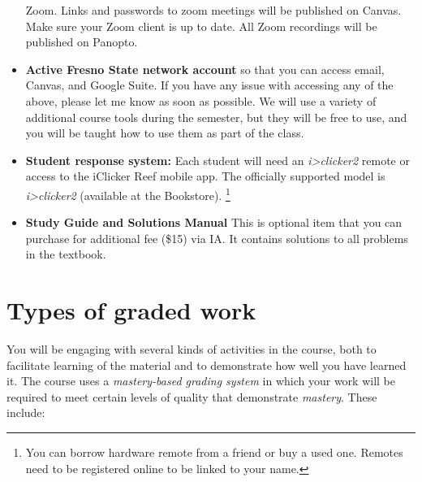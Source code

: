 \begin{itemize}
  Zoom. Links and passwords to zoom meetings will be published on
  Canvas. Make sure your Zoom client is up to date. All Zoom recordings
  will be published on Panopto.
\item
  \textbf{Active Fresno State network account} so that you can access
  email, Canvas, and Google Suite. If you have any issue with accessing
  any of the above, please let me know as soon as possible. We will use
  a variety of additional course tools during the semester, but they
  will be free to use, and you will be taught how to use them as part of
  the class.
\item
  \textbf{Student response system:} Each student will need an
  \emph{i\textgreater clicker2} remote or access to the iClicker Reef
  mobile app. The officially supported model is
  \emph{i\textgreater clicker2} (available at the Bookstore).
  \footnote{You can borrow hardware remote from a friend or buy a used
    one. Remotes need to be registered online to be linked to your name.}
\item
  \textbf{Study Guide and Solutions Manual} This is optional item that
  you can purchase for additional fee (\$15) via IA. It contains
  solutions to all problems in the textbook.
\end{itemize}

\hypertarget{types-of-graded-work}{%
\section{Types of graded work}\label{types-of-graded-work}}

You will be engaging with several kinds of activities in the course,
both to facilitate learning of the material and to demonstrate how well
you have learned it. The course uses a \emph{mastery-based grading
system} in which your work will be required to meet certain levels of
quality that demonstrate \emph{mastery}. These include:

